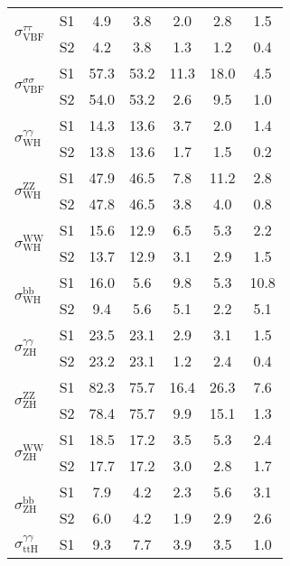 \begin{tabular}{@{} l c c@{\hskip 0.15in} c c c c @{}}
\multirow{2}{*}{$\sigma_{\mathrm{VBF}}^{\tau \tau }$} & S1  & 4.9& 3.8 & 2.0 & 2.8 & 1.5  \\[1pt]
                        & S2  & 4.2& 3.8 & 1.3 & 1.2 & 0.4  \\[4pt]
\multirow{2}{*}{$\sigma_{\mathrm{VBF}}^{\sigma \sigma }$} & S1  & 57.3& 53.2 & 11.3 & 18.0 & 4.5  \\[1pt]
                        & S2  & 54.0& 53.2 & 2.6 & 9.5 & 1.0  \\[4pt]
\multirow{2}{*}{$\sigma_{\mathrm{WH}}^{\gamma \gamma }$} & S1  & 14.3& 13.6 & 3.7 & 2.0 & 1.4  \\[1pt]
                        & S2  & 13.8& 13.6 & 1.7 & 1.5 & 0.2  \\[4pt]
\multirow{2}{*}{$\sigma_{\mathrm{WH}}^{\mathrm{ZZ}}$} & S1  & 47.9& 46.5 & 7.8 & 11.2 & 2.8  \\[1pt]
                        & S2  & 47.8& 46.5 & 3.8 & 4.0 & 0.8  \\[4pt]
\multirow{2}{*}{$\sigma_{\mathrm{WH}}^{\mathrm{WW}}$} & S1  & 15.6& 12.9 & 6.5 & 5.3 & 2.2  \\[1pt]
                        & S2  & 13.7& 12.9 & 3.1 & 2.9 & 1.5  \\[4pt]
\multirow{2}{*}{$\sigma_{\mathrm{WH}}^{\mathrm{bb}}$} & S1  & 16.0& 5.6 & 9.8 & 5.3 & 10.8  \\[1pt]
                        & S2  & 9.4& 5.6 & 5.1 & 2.2 & 5.1  \\[4pt]
\multirow{2}{*}{$\sigma_{\mathrm{ZH}}^{\gamma \gamma }$} & S1  & 23.5& 23.1 & 2.9 & 3.1 & 1.5  \\[1pt]
                        & S2  & 23.2& 23.1 & 1.2 & 2.4 & 0.4  \\[4pt]
\multirow{2}{*}{$\sigma_{\mathrm{ZH}}^{\mathrm{ZZ}}$} & S1  & 82.3& 75.7 & 16.4 & 26.3 & 7.6  \\[1pt]
                        & S2  & 78.4& 75.7 & 9.9 & 15.1 & 1.3  \\[4pt]
\multirow{2}{*}{$\sigma_{\mathrm{ZH}}^{\mathrm{WW}}$} & S1  & 18.5& 17.2 & 3.5 & 5.3 & 2.4  \\[1pt]
                        & S2  & 17.7& 17.2 & 3.0 & 2.8 & 1.7  \\[4pt]
\multirow{2}{*}{$\sigma_{\mathrm{ZH}}^{\mathrm{bb}}$} & S1  & 7.9& 4.2 & 2.3 & 5.6 & 3.1  \\[1pt]
                        & S2  & 6.0& 4.2 & 1.9 & 2.9 & 2.6  \\[4pt]
\multirow{2}{*}{$\sigma_{\mathrm{ttH}}^{\gamma \gamma }$} & S1  & 9.3& 7.7 & 3.9 & 3.5 & 1.0  \\[1pt]

\end{tabular}
